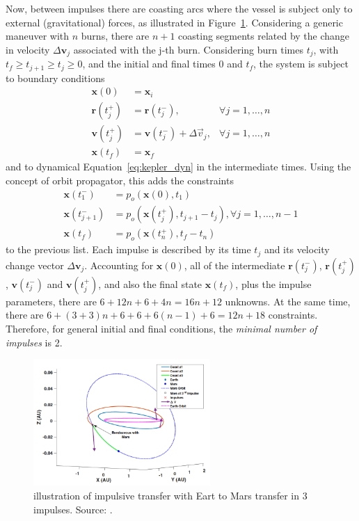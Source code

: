 Now, between impulses there are coasting arcs where the vessel is subject only to external (gravitational) forces, as illustrated in Figure~\ref{fig:impulsive_maneuver_diagram}. Considering a generic maneuver with \(n\) burns, there are \(n+1\) coasting segments related by the change in velocity \(\Delta \mathbf{v}_j\) associated with the j-th burn. Considering burn times \(t_j\), with \(t_f \geq t_{j+1} \geq t_j \geq 0\), and the initial and final times \(0\) and \(t_f\), the system is subject to boundary conditions
\begin{align}
    \mathbf{x}(0) &= \mathbf{x}_i \\
    \mathbf{r}(t_j^+) &= \mathbf{r}(t_j^-),& \forall j=1,\dots,n \\
    \mathbf{v}(t_j^+) &= \mathbf{v}(t_j^-) + \Delta \vec v_j,& \forall j=1,\dots,n \\
    \mathbf{x}(t_f) &= \mathbf{x}_f
\end{align}
and to dynamical Equation~\eqref{eq:kepler_dyn} in the intermediate times. Using the concept of orbit propagator, this adds the constraints
\begin{align}
    \mathbf{x}(t_1^-) &= p_o(\mathbf{x}(0), t_1) \\
    \mathbf{x}(t_{j+1}^-) &= p_o(\mathbf{x}(t_j^+), t_{j+1} - t_j), \forall j = 1, \dots, n-1 \\
    \mathbf{x}(t_f) &= p_o(\mathbf{x}(t_n^+), t_f - t_n)
\end{align}
to the previous list. Each impulse is described by its time \(t_j\) and its velocity change vector \(\Delta \mathbf{v}_j\). Accounting for \(\mathbf{x}(0)\), all of the intermediate \(\mathbf{r}(t_j^-)\), \(\mathbf{r}(t_j^+)\), \(\mathbf{v}(t_j^-)\) and \(\mathbf{v}(t_j^+)\), and also the final state \(\mathbf{x}(t_f)\), plus the impulse parameters, there are \(6 + 12n + 6 + 4n = 16n + 12\) unknowns. At the same time, there are \(6 + (3 + 3)n + 6 + 6 + 6(n-1) + 6 = 12n + 18\) constraints. Therefore, for general initial and final conditions, the \textit{minimal number of impulses} is 2. 

\begin{figure}[htbp]
    \centering
    \includegraphics[width=0.6\textwidth]{img/impulsive_traj_from_how_many_impulses.png}
    \caption{illustration of impulsive transfer with Eart to Mars transfer in 3 impulses. Source: \cite{how_many_impulses}.}
    \label{fig:impulsive_maneuver_diagram}
\end{figure}


